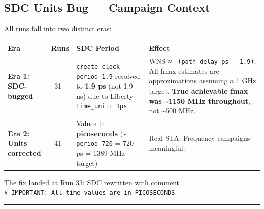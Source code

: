 \subsection{\texorpdfstring{\warn{} SDC Units Bug --- Campaign
Context}{ SDC Units Bug --- Campaign Context}}\label{cr:run:asap7-cpu:warning-sdc-units-bug-campaign-context}

\begin{record}

All runs fall into two distinct eras:

{\footnotesize\setlength{\tabcolsep}{3pt}

{
\begin{longtable}[]{@{}
  >{\raggedright\arraybackslash}p{}
  >{\raggedright\arraybackslash}p{}
  >{\raggedright\arraybackslash}p{}
  >{\raggedright\arraybackslash}p{}@{}}
\toprule\noalign{}
\begin{minipage}[b]{\linewidth}\raggedright
Era
\end{minipage} & \begin{minipage}[b]{\linewidth}\raggedright
Runs
\end{minipage} & \begin{minipage}[b]{\linewidth}\raggedright
SDC Period
\end{minipage} & \begin{minipage}[b]{\linewidth}\raggedright
Effect
\end{minipage} \\
\midrule\noalign{}
\endhead
\bottomrule\noalign{}
\endlastfoot
\textbf{Era 1: SDC-bugged} & 7--31 &
\texttt{create\_\allowbreak{}clock\ -\allowbreak{}period\ 1.\allowbreak{}9}
resolved to \textbf{1.9 ps} (not 1.9 ns) due to Liberty
\texttt{time\_\allowbreak{}unit:\allowbreak{}\ 1ps} & WNS ≈
\texttt{−(path\_\allowbreak{}delay\_\allowbreak{}ps\ −\ 1.\allowbreak{}9)}.
All fmax estimates are approximations assuming a 1 GHz target.
\textbf{True achievable fmax was \textasciitilde1150 MHz throughout},
not \textasciitilde500 MHz. \\
\textbf{Era 2: Units corrected} & 32--41 & Values in
\textbf{picoseconds} (\texttt{-\allowbreak{}period\ 720} = 720 ps = 1389
MHz target) & Real STA. Frequency campaigns meaningful. \\
\end{longtable}
}

}

The fix landed at Run 33: SDC rewritten with comment
\texttt{\#\ IMPORTANT:\allowbreak{}\ All\ time\ values\ are\ in\ PICOSECONDS}.

\begin{center}\rule{0.5\linewidth}{0.5pt}\end{center}

\end{record}

